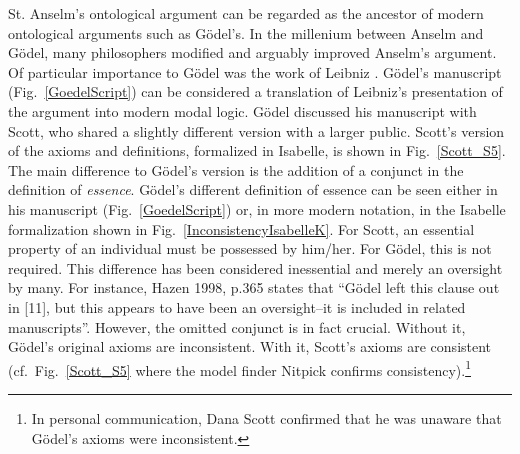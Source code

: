 \documentclass{article}
\begin{document}
St. Anselm's ontological argument \cite{Proslogion} can be regarded as
the ancestor of modern ontological arguments such as G\"odel's. In the
millenium between Anselm and G\"odel, many philosophers modified and
arguably improved Anselm's argument. Of particular importance to
G\"odel was the work of Leibniz \cite{ToDo:Leibniz}.  G\"odel's manuscript
(Fig.~\ref{GoedelScript}) can be considered a translation of Leibniz's
presentation of the argument into modern modal logic. G\"odel
discussed his manuscript with Scott, who shared a slightly different
version with a larger public. Scott's version of the axioms and
definitions, formalized in Isabelle, is shown in
Fig.~\ref{Scott_S5}. The main difference to G\"odel's version is the
addition of a conjunct in the definition of \emph{essence}. G\"odel's
different definition of essence can be seen either in his manuscript
(Fig.~\ref{GoedelScript}) or, in more modern notation, in the Isabelle
formalization shown in Fig.~\ref{InconsistencyIsabelleK}. For Scott,
an essential property of an individual must be possessed by
him/her. For G\"odel, this is not required. This difference has been
considered inessential and merely an oversight by many. For instance,
Hazen 1998, p.365 \cite[p.365]{Hazen} states that ``G\"odel left this
clause out in [11], but this appears to have been an oversight--it is
included in related manuscripts''. However, the omitted conjunct is in
fact crucial. Without it, G\"odel's original axioms are
inconsistent. With it, Scott's axioms are consistent (cf.~Fig.~\ref{Scott_S5}
where the model finder Nitpick \cite{Nitpick} confirms consistency).\footnote{In
  personal communication, Dana Scott confirmed that he was unaware
  that G\"odel's axioms were inconsistent.}


\end{document}
